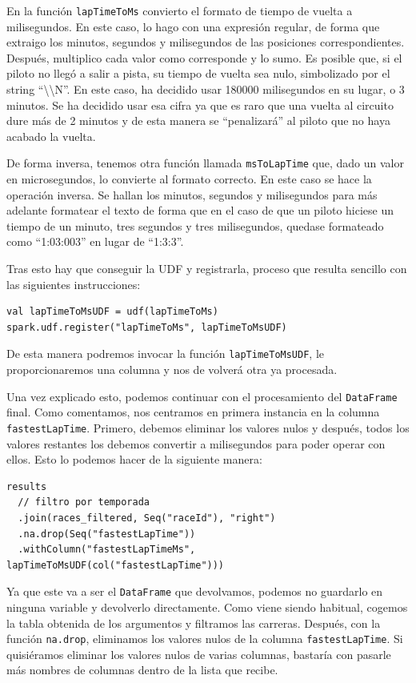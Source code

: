 \documentclass[12pt,twoside,titlepage]{report}
\newcommand{\quotes}[1]{``#1''}
\begin{document}
En la función \texttt{lapTimeToMs} convierto el formato de tiempo de vuelta a milisegundos. En este caso, lo hago con una expresión regular, de forma que extraigo los minutos, segundos y milisegundos de las posiciones correspondientes. Después, multiplico cada valor como corresponde y lo sumo. Es posible que, si el piloto no llegó a salir a pista, su tiempo de vuelta sea nulo, simbolizado por el string \quotes{\textbackslash\textbackslash N}. En este caso, ha decidido usar 180000 milisegundos en su lugar, o 3 minutos. Se ha decidido usar esa cifra ya que es raro que una vuelta al circuito dure más de 2 minutos y de esta manera se \quotes{penalizará} al piloto que no haya acabado la vuelta.

De forma inversa, tenemos otra función llamada \texttt{msToLapTime} que, dado un valor en microsegundos, lo convierte al formato correcto. En este caso se hace la operación inversa. Se hallan los minutos, segundos y milisegundos para más adelante formatear el texto de forma que en el caso de que un piloto hiciese un tiempo de un minuto, tres segundos y tres milisegundos, quedase formateado como \quotes{1:03:003} en lugar de \quotes{1:3:3}.

Tras esto hay que conseguir la UDF y registrarla, proceso que resulta sencillo con las siguientes instrucciones:


\begin{lstlisting}
val lapTimeToMsUDF = udf(lapTimeToMs)
spark.udf.register("lapTimeToMs", lapTimeToMsUDF)
\end{lstlisting}

De esta manera podremos invocar la función \texttt{lapTimeToMsUDF}, le proporcionaremos una columna y nos de volverá otra ya procesada.

Una vez explicado esto, podemos continuar con el procesamiento del \texttt{DataFrame} final. Como comentamos, nos centramos en primera instancia en la columna \texttt{fastestLapTime}. Primero, debemos eliminar los valores nulos y después, todos los valores restantes los debemos convertir a milisegundos para poder operar con ellos. Esto lo podemos hacer de la siguiente manera:

\begin{lstlisting}
results
  // filtro por temporada
  .join(races_filtered, Seq("raceId"), "right")
  .na.drop(Seq("fastestLapTime"))
  .withColumn("fastestLapTimeMs", lapTimeToMsUDF(col("fastestLapTime")))
\end{lstlisting}

Ya que este va a ser el \texttt{DataFrame} que devolvamos, podemos no guardarlo en ninguna variable y devolverlo directamente. Como viene siendo habitual, cogemos la tabla obtenida de los argumentos y filtramos las carreras. Después, con la función \texttt{na.drop}, eliminamos los valores nulos de la columna \texttt{fastestLapTime}. Si quisiéramos eliminar los valores nulos de varias columnas, bastaría con pasarle más nombres de columnas dentro de la lista que recibe.
\end{document}
